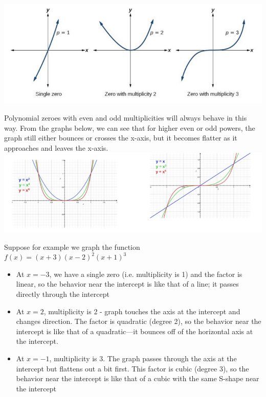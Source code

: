 \documentclass{book}
\begin{document}
	\includegraphics[scale=0.5]{zeromul}
	
	Polynomial zeroes with even and odd multiplicities will always behave in this way. From the graphs below, we can see that for higher even or odd powers, the graph still either bounces or crosses the x-axis, but it becomes flatter as it approaches and leaves the x-axis. \\
	
	\includegraphics[scale=0.6]{oddeven1}
	
	Suppose for example we graph the function $f(x) = (x+3)(x-2)^2(x+1)^3$
	
	\begin{itemize}
		\item At $x = -3$, we have a single zero (i.e. multiplicity is 1) and the factor is linear, so the behavior near the intercept is like that of a line; it passes directly through the intercept
		\item At $x = 2$, multiplicity is 2 - graph touches the axis at the intercept and changes direction. The factor is quadratic (degree 2), so the behavior near the intercept is like that of a quadratic—it bounces off of the horizontal axis at the intercept.
		\item At $x = -1$, multiplicity is 3. The graph passes through the axis at the intercept but flattens out a bit first. This factor is cubic (degree 3), so the behavior near the intercept is like that of a cubic with the same S-shape near the intercept
	\end{itemize}
	
\end{document}
